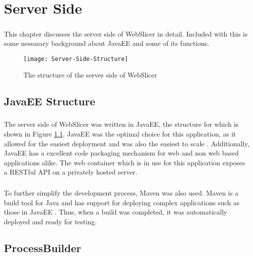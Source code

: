 \chapter{Server Side}
\paragraph{}
This chapter discusses the server side of WebSlicer in detail. 
Included with this is some nessasary background about JavaEE and some of its functions.

\begin{figure}[!ht]
  \centering
  \texttt{[image: Server-Side-Structure]}
  \caption{The structure of the server side of WebSlicer}
  \label{fig:server-side-structure}
\end{figure}

\section{JavaEE Structure}
\paragraph{}
The server side of WebSlicer was written in JavaEE, the structure for which is shown in Figure \ref{fig:server-side-structure}.
JavaEE was the optimal choice for this application, as it allowed for the easiest deployment and was also the easiest to scale \citep{pilgrim-2013}.
Additionally, JavaEE has a excellent code packaging mechanism for web and non web based applications alike.
The web container which is in use for this application exposes a RESTful API on a privately hosted server.

\paragraph{}
To further simplify the development process, Maven was also used.
Maven is a build tool for Java and has support for deploying complex applications such as those in JavaEE \citep{massol-2005}.
Thus, when a build was completed, it was automatically deployed and ready for testing.

\section{ProcessBuilder}

